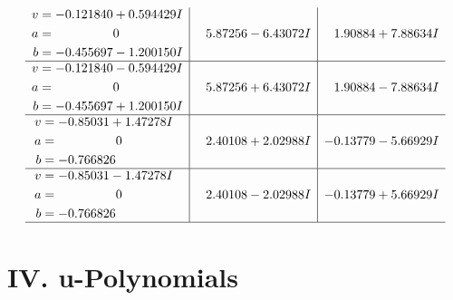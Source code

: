 \documentclass[1p]{elsarticle_modified}
\theoremstyle{definition}
\begin{document}
$$\begin{array}{c|c|c}
\begin{aligned}
v &= -0.121840 + 0.594429 I \\
a &= \phantom{-0.000000 } 0 \\
b &= -0.455697 - 1.200150 I\end{aligned}
 & \phantom{-}5.87256 - 6.43072 I & \phantom{-}1.90884 + 7.88634 I \\ \hline\begin{aligned}
v &= -0.121840 - 0.594429 I \\
a &= \phantom{-0.000000 } 0 \\
b &= -0.455697 + 1.200150 I\end{aligned}
 & \phantom{-}5.87256 + 6.43072 I & \phantom{-}1.90884 - 7.88634 I \\ \hline\begin{aligned}
v &= -0.85031 + 1.47278 I \\
a &= \phantom{-0.000000 } 0 \\
b &= -0.766826\phantom{ +0.000000I}\end{aligned}
 & \phantom{-}2.40108 + 2.02988 I & -0.13779 - 5.66929 I \\ \hline\begin{aligned}
v &= -0.85031 - 1.47278 I \\
a &= \phantom{-0.000000 } 0 \\
b &= -0.766826\phantom{ +0.000000I}\end{aligned}
 & \phantom{-}2.40108 - 2.02988 I & -0.13779 + 5.66929 I\\
 \hline 
 \end{array}$$\newpage
\newpage\renewcommand{\arraystretch}{1}
\centering \section*{ IV. u-Polynomials}
\end{document}

